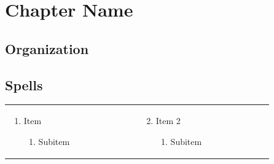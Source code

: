 \chapter{Chapter Name}
\label{ch:chname}
\section{Organization}

\section{Spells}
\renewcommand{\labelenumii}{\arabic{enumii}.}
\begin{tabular}{@{} p{0.25\linewidth} p{0.25\linewidth}}
\begin{enumerate}
	\item Item
	\begin{enumerate}
		\item Subitem
	\end{enumerate}
\end{enumerate} &
\begin{enumerate}
	\setcounter{enumi}{1}
	\item Item 2
	\begin{enumerate}
		\item Subitem
	\end{enumerate}
\end{enumerate} 
\end{tabular}
\pagebreak

\section{}

